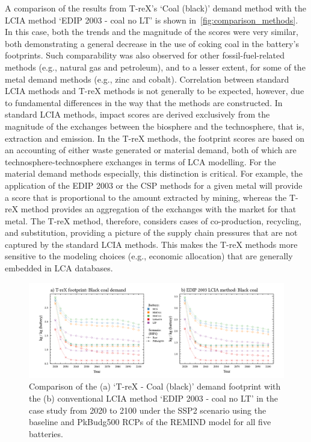 A comparison of the results from T-reX's `Coal (black)' demand method with the LCIA method `EDIP 2003 - coal no LT' is shown in~\autoref{fig:comparison_methods}. In this case, both the trends and the magnitude of the scores were very similar, both demonstrating a general decrease in the use of coking coal in the battery's footprints. Such comparability was also observed for other fossil-fuel-related methods (e.g., natural gas and petroleum), and to a lesser extent, for some of the metal demand methods (e.g., zinc and cobalt). Correlation between standard LCIA methods and T-reX methods is not generally to be expected, however, due to fundamental differences in the way that the methods are constructed. In standard LCIA methods, impact scores are derived exclusively from the magnitude of the exchanges between the biosphere and the technosphere, that is, extraction and emission. In the T-reX methods, the footprint scores are based on an accounting of either waste generated or material demand, both of which are technosphere-technosphere exchanges in terms of LCA modelling. For the material demand methods especially, this distinction is critical. For example, the application of the EDIP 2003 or the CSP methods for a given metal will provide a score that is proportional to the amount extracted by mining, whereas the T-reX method provides an aggregation of the exchanges with the market for that metal. The T-reX method, therefore, considers cases of co-production, recycling, and substitution, providing a picture of the supply chain pressures that are not captured by the standard LCIA methods. This makes the T-reX methods more sensitive to the modeling choices (e.g., economic allocation) that are generally embedded in LCA databases.

\begin{figure}[H]
    \centering
    \includegraphics[width=16cm]{figures/T-reX-coalANDedip.pdf}
    \caption{Comparison of the (a) `T-reX - Coal (black)' demand footprint with the (b) conventional LCIA method `EDIP 2003 - coal no LT'  in the case study from 2020 to 2100 under the SSP2 scenario using the baseline and PkBudg500 RCPs of the REMIND model for all five batteries.}\label{fig:comparison_methods}
\end{figure}

